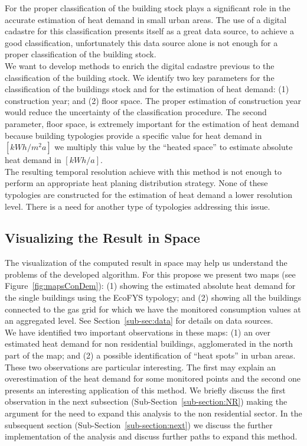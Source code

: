 \documentclass[authoryear,preprint,review,12pt]{elsarticle}
\begin{document}
\begin{linenumbers}
For the proper classification of the building stock plays a significant role in
the accurate estimation of heat demand in small urban areas. The use of a
digital cadastre for this classification presents itself as a great data
source, to achieve a good classification, unfortunately this data source alone
is not enough for a proper classification of the building stock.\\

We want to develop methods to enrich the digital cadastre previous to the
classification of the building stock. We identify two key parameters for the
classification of the buildings stock and for the estimation of heat demand:
(1) construction year; and (2) floor space.  The proper estimation of
construction year would reduce the uncertainty of the classification procedure.
The second parameter, floor space, is extremely important for the estimation of
heat demand because building typologies provide a specific value for heat
demand in $[kWh/m^2a]$ we multiply this value by the ``heated space'' to
estimate absolute heat demand in $[kWh/a]$.\\

The resulting temporal resolution achieve with this method is not enough to
perform an appropriate heat planing distribution strategy. None of these
typologies are constructed for the estimation of heat demand a lower resolution
level. There is a need for another type of typologies addressing this issue.\\

\subsection{Visualizing the Result in Space}

The visualization of the computed result in space may help us understand the
problems of the developed algorithm.  For this propose we present two maps (see
Figure~\ref{fig:mapsConDem}): (1) showing the estimated absolute heat demand
for the single buildings using the EcoFYS typology; and (2) showing all the
buildings connected to the gas grid for which we have the monitored consumption
values at an aggregated level.  See Section~\ref{sub-sec:data} for details on
data sources.\\

We have identified two important observations in these maps: (1) an over
estimated heat demand for non residential buildings, agglomerated in the north
part of the map; and (2) a possible identification of ``heat spots'' in urban
areas.  These two observations are particular interesting. The first may
explain an overestimation of the heat demand for some monitored points
and the second one presents an interesting application of this method.  We
briefly discuss the first observation in the next subsection
(Sub-Section~\ref{sub-section:NR}) making the argument for the need to expand
this analysis to the non residential sector.  In the subsequent section
(Sub-Section~\ref{sub-section:next}) we discuss the further implementation of
the analysis and discuss further paths to expand this method.\\


\end{linenumbers}
\end{document}
